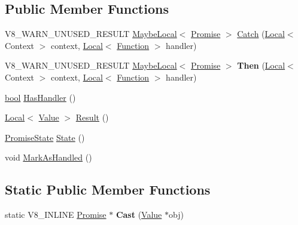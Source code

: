 \subsection*{Public Member Functions}
\begin{DoxyCompactItemize}
\item 
V8\+\_\+\+W\+A\+R\+N\+\_\+\+U\+N\+U\+S\+E\+D\+\_\+\+R\+E\+S\+U\+LT \mbox{\hyperlink{classv8_1_1MaybeLocal}{Maybe\+Local}}$<$ \mbox{\hyperlink{classv8_1_1Promise}{Promise}} $>$ \mbox{\hyperlink{classv8_1_1Promise_aca18f9f798a1a15ab5523e44d332e8af}{Catch}} (\mbox{\hyperlink{classv8_1_1Local}{Local}}$<$ Context $>$ context, \mbox{\hyperlink{classv8_1_1Local}{Local}}$<$ \mbox{\hyperlink{classv8_1_1Function}{Function}} $>$ handler)
\item 
\mbox{\label{classv8_1_1Promise_aea0ba9752b2183dc7571216c94b3b475}} 
V8\+\_\+\+W\+A\+R\+N\+\_\+\+U\+N\+U\+S\+E\+D\+\_\+\+R\+E\+S\+U\+LT \mbox{\hyperlink{classv8_1_1MaybeLocal}{Maybe\+Local}}$<$ \mbox{\hyperlink{classv8_1_1Promise}{Promise}} $>$ {\bfseries Then} (\mbox{\hyperlink{classv8_1_1Local}{Local}}$<$ Context $>$ context, \mbox{\hyperlink{classv8_1_1Local}{Local}}$<$ \mbox{\hyperlink{classv8_1_1Function}{Function}} $>$ handler)
\item 
\mbox{\hyperlink{classbool}{bool}} \mbox{\hyperlink{classv8_1_1Promise_aeea8bdfdbe2291632d7f0d45394c1722}{Has\+Handler}} ()
\item 
\mbox{\hyperlink{classv8_1_1Local}{Local}}$<$ \mbox{\hyperlink{classv8_1_1Value}{Value}} $>$ \mbox{\hyperlink{classv8_1_1Promise_a81327dabe172ce53ce0e8f2033763ac2}{Result}} ()
\item 
\mbox{\hyperlink{classv8_1_1Promise_a0c357b9d99a634f98a5a203b0a322544}{Promise\+State}} \mbox{\hyperlink{classv8_1_1Promise_a0eaacfd366a0c22be445681ec97412be}{State}} ()
\item 
void \mbox{\hyperlink{classv8_1_1Promise_a17d6e3484dc051e1c05a31fd285b0f9f}{Mark\+As\+Handled}} ()
\end{DoxyCompactItemize}
\subsection*{Static Public Member Functions}
\begin{DoxyCompactItemize}
\item 
\mbox{\label{classv8_1_1Promise_adfa3b953beb2678dd3b5d6ddb3f0746d}} 
static V8\+\_\+\+I\+N\+L\+I\+NE \mbox{\hyperlink{classv8_1_1Promise}{Promise}} $\ast$ {\bfseries Cast} (\mbox{\hyperlink{classv8_1_1Value}{Value}} $\ast$obj)
\end{DoxyCompactItemize}
